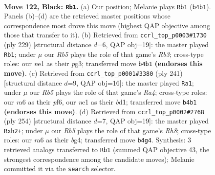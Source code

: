 \documentclass[11pt]{article}
\begin{document}
\clearpage

\begin{figure}[p]\centering
\begin{subfigure}{0.46\textwidth}\centering
\resizebox{\linewidth}{!}{%
\newchessgame
\chessboard[
  setfen={8/4k3/R7/5K2/1r4P1/8/8/4N3 b - - 28 122},
  showmover=false,
  pgfstyle=straightmove, color=movearrow, markmove={b4-b1}
]}
\caption{}
\end{subfigure}\hfill
\begin{subfigure}{0.46\textwidth}\centering
\resizebox{\linewidth}{!}{%
\newchessgame
\chessboard[
  setfen={6k1/R7/1r4P1/7K/8/6P1/8/8 b - - 0 115},
  showmover=false,
  pgfstyle=straightmove, color=movearrow, markmove={b6-b1}
]}
\caption{}
\end{subfigure}
\\[4pt]
\begin{subfigure}{0.46\textwidth}\centering
\resizebox{\linewidth}{!}{%
\newchessgame
\chessboard[
  setfen={5k2/8/5P2/r3P3/5K2/8/8/3B4 b - - 56 121},
  showmover=false,
  pgfstyle=straightmove, color=movearrow, markmove={a5-a1}
]}
\caption{}
\end{subfigure}\hfill
\begin{subfigure}{0.46\textwidth}\centering
\resizebox{\linewidth}{!}{%
\newchessgame
\chessboard[
  setfen={7R/8/8/8/6b1/8/6kp/4K3 w - - 2 128},
  showmover=false,
  pgfstyle=straightmove, color=movearrow, markmove={h8-h2}
]}
\caption{}
\end{subfigure}
\caption{\textbf{Move 122, Black: \texttt{Rb1}.} (a) Our position; Melanie plays \texttt{Rb1} (\texttt{b4b1}). Panels (b)--(d) are the retrieved master positions whose correspondence most drove this move (highest QAP objective among those that transfer to it). (b) Retrieved from \texttt{ccrl\_top\_p0003\#1730} (ply 229) [structural distance $d$=6, QAP obj=19]: the master played \texttt{Rb1}; under $\mu$ our \emph{Rb5} plays the role of that game's \emph{Rb3}; cross-type roles: our \emph{n}e1 as their \emph{p}g3; transferred move \texttt{b4b1} \textbf{(endorses this move)}. (c) Retrieved from \texttt{ccrl\_top\_p0001\#3380} (ply 241) [structural distance $d$=9, QAP obj=16]: the master played \texttt{Ra1}; under $\mu$ our \emph{Rb5} plays the role of that game's \emph{Ra4}; cross-type roles: our \emph{r}a6 as their \emph{p}f6, our \emph{n}e1 as their \emph{b}d1; transferred move \texttt{b4b1} \textbf{(endorses this move)}. (d) Retrieved from \texttt{ccrl\_top\_p0002\#2768} (ply 254) [structural distance $d$=7, QAP obj=19]: the master played \texttt{Rxh2+}; under $\mu$ our \emph{Rb5} plays the role of that game's \emph{Rh8}; cross-type roles: our \emph{r}a6 as their \emph{b}g4; transferred move \texttt{b4g4}. Synthesis: 3 retrieved analogs transferred to \texttt{Rb1} (summed QAP objective 43, the strongest correspondence among the candidate moves); Melanie committed it via the \texttt{search} selector.}
\label{fig:thought-m243}
\end{figure}
\end{document}
